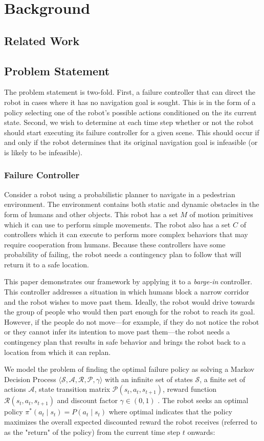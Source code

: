\documentclass[letterpaper]{IEEEtran}
\begin{document}
	\section{Background}
		\subsection{Related Work}
		\subsection{Problem Statement}
			The problem statement is two-fold. First, a failure controller that can direct the robot in cases where it has no navigation goal is sought. This is in the form of a policy selecting one of the robot's possible actions conditioned on the its current state. Second, we wish to determine at each time step whether or not the robot should start executing its failure controller for a given scene. This should occur if and only if the robot determines that its original navigation goal is infeasible (or is likely to be infeasible).
			
			\subsubsection{Failure Controller}
				Consider a robot using a probabilistic planner to navigate in a pedestrian environment. The environment contains both static and dynamic obstacles in the form of humans and other objects. This robot has a set $M$ of motion primitives which it can use to perform simple movements. The robot also has a set $C$ of controllers which it can execute to perform more complex behaviors that may require cooperation from humans. Because these controllers have some probability of failing, the robot needs a contingency plan to follow that will return it to a safe location. 
				
				This paper demonstrates our framework by applying it to a \textit{barge-in} controller. This controller addresses a situation in which humans block a narrow corridor and the robot wishes to move past them. Ideally, the robot would drive towards the group of people who would then part enough for the robot to reach its goal. However, if the people do not move---for example, if they do not notice the robot or they cannot infer its intention to move past them---the robot needs a contingency plan that results in safe behavior and brings the robot back to a location from which it can replan.
				
				We model the problem of finding the optimal failure policy as solving a Markov Decision Process $\langle\mathcal{S}, \mathcal{A}, \mathcal{R}, \mathcal{P}, \gamma\rangle$ with an infinite set of states $\mathcal{S}$, a finite set of actions $\mathcal{A}$, state transition matrix $\mathcal{P}(s_t, a_t, s_{t+1})$, reward function $\mathcal{R}(s_t, a_t, s_{t+1})$ and discount factor $\gamma \in (0, 1)$ \cite{suttonandbarto}. The robot seeks an optimal policy $\pi^*(a_t \mid s_t)=P(a_t \mid s_t)$ where optimal indicates that the policy maximizes the overall expected discounted reward the robot receives (referred to as the "return" of the policy) from the current time step $t$ onwards:
				
\end{document}
